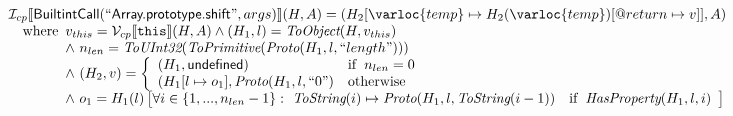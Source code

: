 \[\begin{array}{l}
\I _{cp}\lbr \SF{BuiltintCall}(``\SF{Array.prototype.shift}",args)\rbr(H,A)
 = (H_2[\varloc{temp}\mapsto H_2(\varloc{temp})[\varprop{return}\mapsto v]], A) \\
\quad\wherec{
  v_{this} = \V _{cp}\lbr \TT{this}\rbr (H,A) \land (H_1,l) = \hf{ToObject}(H,v_{this})\\
  \land\ n_{len} = \hf{ToUInt32}(\hf{ToPrimitive}(\hf{Proto}(H_1, l, ``length")))\\
  \land\ (H_2,v) = \left\{\begin{array}{ll}
    (H_1,\SF{undefined}) &  \ifc{n_{len} = 0}\\
    (H_1[l \mapsto o_1], \hf{Proto}(H_1, l, ``0")& \owc
    \end{array}\right.\\
  \land\ o_1 = H_1(l)\left[\forall i \in \{1,...,n_{len}-1\}: \
      \hf{ToString}(i) \mapsto \hf{Proto}(H_1, l, \hf{ToString}(i-1))\quad\ifc{\hf{HasProperty}(H_1, l, i)}\right]\\
  }\\
\\\\
\end{array}
\]

